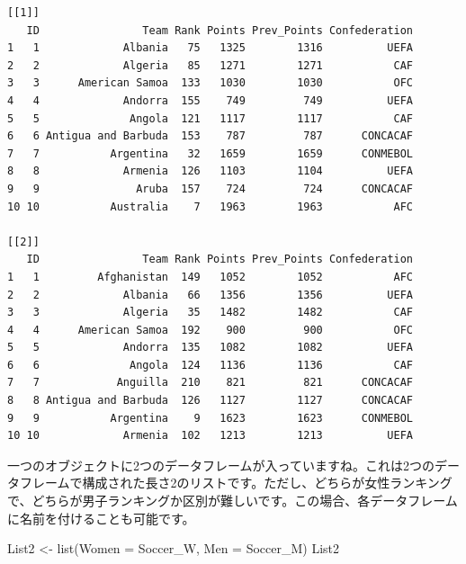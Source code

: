 \documentclass[
  a4paper,
  pandoc,
  ja=standard,
  jafont=haranoaji]{bxjsbook}
\newenvironment{Shaded}{\begin{snugshade}}{\end{snugshade}}
\newcommand{\AttributeTok}[1]{\textcolor[rgb]{0.00,0.48,0.65}{#1}}
\newcommand{\FunctionTok}[1]{\textcolor[rgb]{0.28,0.35,0.67}{#1}}
\newcommand{\NormalTok}[1]{\textcolor[rgb]{0.00,0.48,0.65}{#1}}
\newcommand{\OtherTok}[1]{\textcolor[rgb]{0.00,0.48,0.65}{#1}}
\begin{document}
\begin{verbatim}
[[1]]
   ID                Team Rank Points Prev_Points Confederation
1   1             Albania   75   1325        1316          UEFA
2   2             Algeria   85   1271        1271           CAF
3   3      American Samoa  133   1030        1030           OFC
4   4             Andorra  155    749         749          UEFA
5   5              Angola  121   1117        1117           CAF
6   6 Antigua and Barbuda  153    787         787      CONCACAF
7   7           Argentina   32   1659        1659      CONMEBOL
8   8             Armenia  126   1103        1104          UEFA
9   9               Aruba  157    724         724      CONCACAF
10 10           Australia    7   1963        1963           AFC

[[2]]
   ID                Team Rank Points Prev_Points Confederation
1   1         Afghanistan  149   1052        1052           AFC
2   2             Albania   66   1356        1356          UEFA
3   3             Algeria   35   1482        1482           CAF
4   4      American Samoa  192    900         900           OFC
5   5             Andorra  135   1082        1082          UEFA
6   6              Angola  124   1136        1136           CAF
7   7            Anguilla  210    821         821      CONCACAF
8   8 Antigua and Barbuda  126   1127        1127      CONCACAF
9   9           Argentina    9   1623        1623      CONMEBOL
10 10             Armenia  102   1213        1213          UEFA
\end{verbatim}

一つのオブジェクトに2つのデータフレームが入っていますね。これは2つのデータフレームで構成された長さ2のリストです。ただし、どちらが女性ランキングで、どちらが男子ランキングか区別が難しいです。この場合、各データフレームに名前を付けることも可能です。

\begin{Shaded}
\begin{Highlighting}[numbers=left,,]
\NormalTok{List2 }\OtherTok{\textless{}{-}} \FunctionTok{list}\NormalTok{(}\AttributeTok{Women =}\NormalTok{ Soccer\_W, }\AttributeTok{Men =}\NormalTok{ Soccer\_M)}
\NormalTok{List2}
\end{Highlighting}
\end{Shaded}
\end{document}
